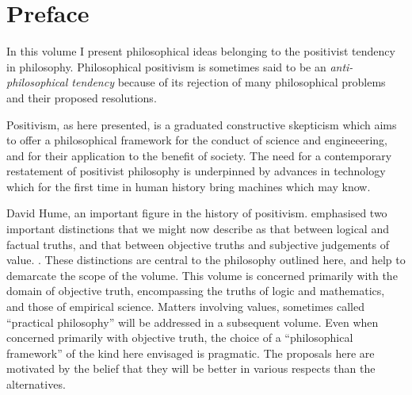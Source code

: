 

{\parskip=0pt\tableofcontents}

\newcommand{\listpositionname}{Positions}
\newlistof[chapter]{position}{pos}{\listpositionname}

\newcommand{\position}[2]{%
\refstepcounter{position}
{\paragraph{\textbf{#1 \theposition}} #2}
\addcontentsline{pos}{position}{\protect\numberline{\theposition} #2}\par}



\chapter*{Preface}\label{Preface}

In this volume I present philosophical ideas belonging to the positivist tendency in philosophy.
Philosophical positivism is sometimes said to be an \emph{anti-philosophical tendency} because of its rejection of many philosophical problems and their proposed resolutions.

Positivism, as here presented, is a graduated constructive skepticism which aims to offer a philosophical framework for the conduct of science and engineeering, and for their application to the benefit of society.
The need for a contemporary restatement of positivist philosophy is underpinned by advances in technology which for the first time in human history bring machines which may know.

David Hume, an important figure in the history of positivism. emphasised two important distinctions that we might now describe as that between logical and factual truths, and that between objective truths and subjective judgements of value.
.
These distinctions are central to the philosophy outlined here, and help to demarcate the scope of the volume.
This volume is concerned primarily with the domain of objective truth, encompassing the truths of logic and mathematics, and those of empirical science.
Matters involving values, sometimes called ``practical philosophy'' will be addressed in a subsequent volume.
Even when concerned primarily with objective truth, the choice of a ``philosophical framework'' of the kind here envisaged is pragmatic.
The proposals here are motivated by the belief that they will be better in various respects than the alternatives.

\mainmatter

